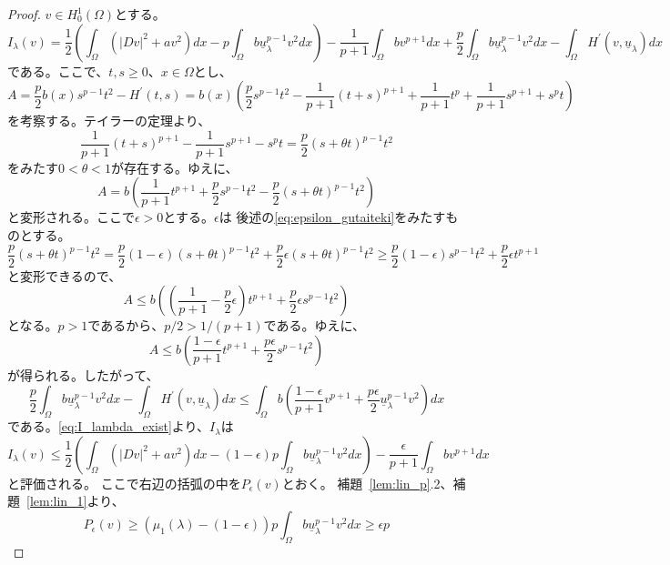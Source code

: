 \begin{proof}
 $v \in H^1_0(\Omega)$とする。
 \begin{equation}
  I_\lambda (v) = \frac{1}{2} \left( \int_\Omega \left( \lvert Dv
                                                  \rvert^2 + a v^2
                                                 \right) dx - p
  \int_\Omega b \underline{u}_\lambda^{p-1} v^2 dx \right) -
  \frac{1}{p+1} \int_\Omega b v^{p+1} dx + \frac{p}{2} \int_\Omega b
  \underline{u}_\lambda ^{p-1} v^2 dx - \int_\Omega H^\prime (v,
  \underline{u}_\lambda) dx \label{eq:I_lambda_exist}
 \end{equation}
 である。ここで、$t, s \geq 0$、$x \in \Omega$とし、
 \[
 A = \frac{p}{2} b(x) s^{p-1} t^2 - H^\prime(t, s) = b(x) \left(
 \frac{p}{2} s^{p-1} t^2 - \frac{1}{p+1} (t+s)^{p+1} +
 \frac{1}{p+1}t^p + \frac{1}{p+1} s^{p+1} + s^p t \right)
 \]
 を考察する。テイラーの定理より、
\[
 \frac{1}{p+1} (t+s)^{p+1} - \frac{1}{p+1} s^{p+1} - s^p t =
 \frac{p}{2} (s+\theta t)^{p-1} t^2
\]
 をみたす$0 < \theta < 1$が存在する。ゆえに、
 \[
 A = b \left( \frac{1}{p+1} t^{p+1} + \frac{p}{2} s^{p-1} t^2 -
 \frac{p}{2} (s + \theta t)^{p-1} t^2\right)
\]
 と変形される。ここで$\epsilon > 0$とする。$\epsilon$は
 後述の\eqref{eq:epsilon_gutaiteki}をみたすものとする。
 \[
 \frac{p}{2}(s + \theta t)^{p-1} t^2 = \frac{p}{2}(1 - \epsilon)(s +
 \theta t)^{p-1} t^2 + \frac{p}{2} \epsilon (s+\theta t)^{p-1} t^2
 \geq \frac{p}{2} (1- \epsilon) s^{p-1}t^2 + \frac{p}{2} \epsilon t^{p+1}
 \]
 と変形できるので、
 \[
 A \leq b \left( \left( \frac{1}{p+1} - \frac{p}{2} \epsilon \right)
 t^{p+1} + \frac{p}{2}\epsilon s^{p-1} t^2 \right)
 \]
 となる。$p > 1$であるから、$p/2 > 1/(p+1)$である。ゆえに、
 \[
 A \leq b \left( \frac{1 - \epsilon}{p+1} t^{p+1} +
 \frac{p\epsilon}{2} s^{p-1} t^2 \right)
 \]
 が得られる。したがって、
 \[
 \frac{p}{2} \int_\Omega b \underline{u}_\lambda^{p-1} v^2 dx -
 \int_\Omega H^\prime (v, \underline{u}_\lambda) dx \leq \int_\Omega b
 \left( \frac{1-\epsilon}{p+1} v^{p+1} + \frac{p \epsilon}{2}
 \underline{u}_\lambda ^{p-1} v^2 \right) dx
 \]
 である。\eqref{eq:I_lambda_exist}より、$I_\lambda$は
 \[
 I_\lambda(v) \leq \frac{1}{2} \left( \int_\Omega \left( \lvert Dv
 \rvert^{2} + a v^2\right)dx - (1 -\epsilon)p \int_\Omega b
 \underline{u}_\lambda^{p-1} v^2 dx \right) - \frac{\epsilon}{p+1}
 \int_\Omega bv^{p+1} dx
\]
 と評価される。
 ここで右辺の括弧の中を$P_\epsilon(v)$とおく。
 補題~\ref{lem:lin_p}.2、補題~\ref{lem:lin_1}より、
 \[
  P_\epsilon(v) \geq \left(\mu_1(\lambda) - (1 - \epsilon) \right) p
 \int_\Omega b
 \underline{u}_\lambda^{p-1} v^2 dx \geq \epsilon p 
\]
\end{proof}
